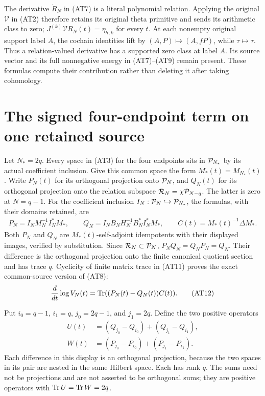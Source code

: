 The derivative $\dot R_N$ in (AT7) is a literal polynomial relation.
Applying the original $\mathcal V$ in (AT2) therefore retains its
original theta primitive and sends its arithmetic class to zero;
$J^{(k)}\mathcal V R_N(t)=\eta_{h,k}$ for every $t$.
At each nonempty original support label $A$, the cochain identities
lift by $(A,P)\mapsto(A,fP)$, while $\tau\mapsto\tau$.
Thus a relation-valued derivative has a supported zero class at
label $A$. Its source vector and its full nonnegative energy in
(AT7)--(AT9) remain present. These formulas compute their
contribution rather than deleting it after taking cohomology.

\section{The signed four-endpoint term on one retained source}

Let $N_*=2q$. Every space in (AT3) for the four endpoints sits in
$\mathcal P_{N_*}$ by its actual coefficient inclusion. Give this common
space the form $M_*(t)=M_{N_*}(t)$. Write $P_N(t)$ for its
orthogonal projection onto $\mathcal P_N$, and $Q_N(t)$ for its
orthogonal projection onto the relation subspace
$\mathcal R_N=\chi\mathcal P_{N-q}$. The latter is zero at $N=q-1$.
For the coefficient inclusion $I_N:\mathcal P_N\hookrightarrow\mathcal P_{N_*}$,
the formulas, with their domains retained, are
\[
 \begin{gathered}
 P_N=I_NM_N^{-1}I_N^*M_*,\qquad
 Q_N=I_NB_NH_N^{-1}B_N^*I_N^*M_*,\qquad
 C(t)=M_*(t)^{-1}\Delta M_*.                   \end{gathered}
 \tag{AT11}
\]
Both $P_N$ and $Q_N$ are $M_*(t)$-self-adjoint idempotents with
their displayed images, verified by substitution. Since
$\mathcal R_N\subset\mathcal P_N$, $P_NQ_N=Q_NP_N=Q_N$. Their difference is
the orthogonal projection onto the finite canonical quotient
section and has trace $q$. Cyclicity of finite matrix trace in
(AT11) proves the exact common-source version of (AT8):
\[
 \frac{d}{dt}\log V_N(t)=\operatorname{Tr}((P_N(t)-Q_N(t))C(t)).
                                                        \tag{AT12}
\]

Put $i_0=q-1$, $i_1=q$, $j_0=2q-1$, and $j_1=2q$.
Define the two positive operators
\[
 \begin{split}
 U(t)&=(Q_{j_0}-Q_{i_0})+(Q_{j_1}-Q_{i_1}),\\
 W(t)&=(P_{j_0}-P_{i_0})+(P_{j_1}-P_{i_1}).    \end{split}
 \tag{AT13}
\]
Each difference in this display is an orthogonal projection,
because the two spaces in its pair are nested in the same
Hilbert space. Each has rank $q$. The sums need not be
projections and are not asserted to be orthogonal sums; they
are positive operators with $\operatorname{Tr} U=\operatorname{Tr} W=2q$.

